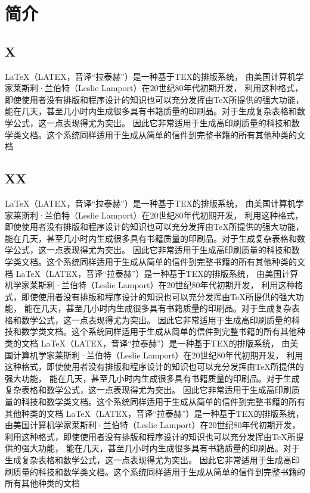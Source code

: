 
\chapter{简\quad 介}
\section{X}
LaTeX（LATEX，音译“拉泰赫”）是一种基于ΤΕΧ的排版系统，
由美国计算机学家莱斯利·兰伯特（Leslie Lamport）在20世纪80年代初期开发，
利用这种格式，即使使用者没有排版和程序设计的知识也可以充分发挥由TeX所提供的强大功能，
能在几天，甚至几小时内生成很多具有书籍质量的印刷品。对于生成复杂表格和数学公式，这一点表现得尤为突出。
因此它非常适用于生成高印刷质量的科技和数学类文档。这个系统同样适用于生成从简单的信件到完整书籍的所有其他种类的文档

\section{XX}
LaTeX（LATEX，音译“拉泰赫”）是一种基于ΤΕΧ的排版系统，
由美国计算机学家莱斯利·兰伯特（Leslie Lamport）在20世纪80年代初期开发，
利用这种格式，即使使用者没有排版和程序设计的知识也可以充分发挥由TeX所提供的强大功能，
能在几天，甚至几小时内生成很多具有书籍质量的印刷品。对于生成复杂表格和数学公式，这一点表现得尤为突出。
因此它非常适用于生成高印刷质量的科技和数学类文档。这个系统同样适用于生成从简单的信件到完整书籍的所有其他种类的文档
LaTeX（LATEX，音译“拉泰赫”）是一种基于ΤΕΧ的排版系统，
由美国计算机学家莱斯利·兰伯特（Leslie Lamport）在20世纪80年代初期开发，
利用这种格式，即使使用者没有排版和程序设计的知识也可以充分发挥由TeX所提供的强大功能，
能在几天，甚至几小时内生成很多具有书籍质量的印刷品。对于生成复杂表格和数学公式，这一点表现得尤为突出。
因此它非常适用于生成高印刷质量的科技和数学类文档。这个系统同样适用于生成从简单的信件到完整书籍的所有其他种类的文档
LaTeX（LATEX，音译“拉泰赫”）是一种基于ΤΕΧ的排版系统，
由美国计算机学家莱斯利·兰伯特（Leslie Lamport）在20世纪80年代初期开发，
利用这种格式，即使使用者没有排版和程序设计的知识也可以充分发挥由TeX所提供的强大功能，
能在几天，甚至几小时内生成很多具有书籍质量的印刷品。对于生成复杂表格和数学公式，这一点表现得尤为突出。
因此它非常适用于生成高印刷质量的科技和数学类文档。这个系统同样适用于生成从简单的信件到完整书籍的所有其他种类的文档
LaTeX（LATEX，音译“拉泰赫”）是一种基于ΤΕΧ的排版系统，
由美国计算机学家莱斯利·兰伯特（Leslie Lamport）在20世纪80年代初期开发，
利用这种格式，即使使用者没有排版和程序设计的知识也可以充分发挥由TeX所提供的强大功能，
能在几天，甚至几小时内生成很多具有书籍质量的印刷品。对于生成复杂表格和数学公式，这一点表现得尤为突出。
因此它非常适用于生成高印刷质量的科技和数学类文档。这个系统同样适用于生成从简单的信件到完整书籍的所有其他种类的文档